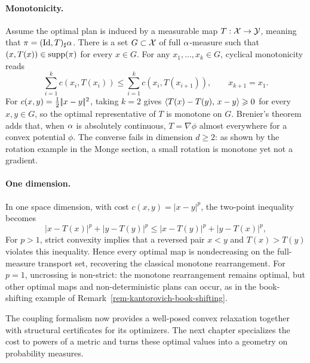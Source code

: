 \paragraph{Monotonicity.}

Assume the optimal plan is induced by a measurable map $T:\mathcal{X}\to\mathcal{Y}$, meaning that $\pi=(\mathrm{Id},T)_\sharp\alpha$. There is a set $G\subset\mathcal{X}$ of full $\alpha$-measure such that $(x,T(x))\in\operatorname{supp}(\pi)$ for every $x\in G$. For any $x_1,\ldots,x_k\in G$, cyclical monotonicity reads
\[
	\sum_{i=1}^k c(x_i,T(x_i))
	\leq
	\sum_{i=1}^k c(x_i,T(x_{i+1})),
	\qquad x_{k+1}=x_1.
\]
For $c(x,y)=\frac12|\!| x-y |\!|^2$, taking $k=2$ gives $\langle T(x)-T(y),\,x-y\rangle\geqslant0$ for every $x,y\in G$, so the optimal representative of $T$ is monotone on $G$. Brenier's theorem adds that, when $\alpha$ is absolutely continuous, $T=\nabla\phi$ almost everywhere for a convex potential $\phi$. The converse fails in dimension $d\geq2$: as shown by the rotation example in the Monge section, a small rotation is monotone yet not a gradient.

\paragraph{One dimension.}

In one space dimension, with cost $c(x,y)=|x-y|^p$, the two-point inequality becomes
\[
	|x-T(x)|^p+|y-T(y)|^p
	\leq
	|x-T(y)|^p+|y-T(x)|^p,
\]
For $p>1$, strict convexity implies that a reversed pair $x<y$ and $T(x)>T(y)$ violates this inequality. Hence every optimal map is nondecreasing on the full-measure transport set, recovering the classical monotone rearrangement. For $p=1$, uncrossing is non-strict: the monotone rearrangement remains optimal, but other optimal maps and non-deterministic plans can occur, as in the book-shifting example of Remark~\ref{rem-kantorovich-book-shifting}.

The coupling formalism now provides a well-posed convex relaxation together with structural certificates for its optimizers. The next chapter specializes the cost to powers of a metric and turns these optimal values into a geometry on probability measures.

